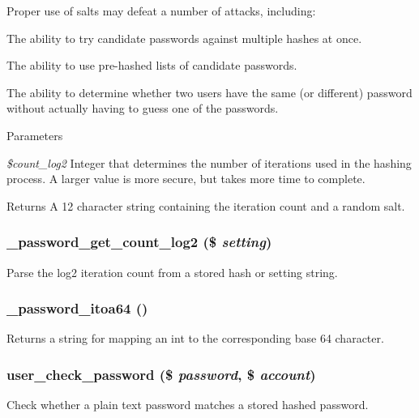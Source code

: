 Proper use of salts may defeat a number of attacks, including:
\begin{DoxyItemize}
\item The ability to try candidate passwords against multiple hashes at once.
\item The ability to use pre-\/hashed lists of candidate passwords.
\item The ability to determine whether two users have the same (or different) password without actually having to guess one of the passwords.
\end{DoxyItemize}


\begin{DoxyParams}{Parameters}
\item[{\em \$count\_\-log2}]Integer that determines the number of iterations used in the hashing process. A larger value is more secure, but takes more time to complete.\end{DoxyParams}
\begin{DoxyReturn}{Returns}
A 12 character string containing the iteration count and a random salt. 
\end{DoxyReturn}
\hypertarget{password_8inc_a9af4ef28bcef6a4f53e9eed9735848b5}{
\subsubsection[{\_\-password\_\-get\_\-count\_\-log2}]{\setlength{\rightskip}{0pt plus 5cm}\_\-password\_\-get\_\-count\_\-log2 (\$ {\em setting})}}
\label{password_8inc_a9af4ef28bcef6a4f53e9eed9735848b5}
Parse the log2 iteration count from a stored hash or setting string. \hypertarget{password_8inc_acfa07cc7bbe581412346fcc7ec03cda3}{
\subsubsection[{\_\-password\_\-itoa64}]{\setlength{\rightskip}{0pt plus 5cm}\_\-password\_\-itoa64 ()}}
\label{password_8inc_acfa07cc7bbe581412346fcc7ec03cda3}
Returns a string for mapping an int to the corresponding base 64 character. \hypertarget{password_8inc_a8fca5fd75cd7a3c609e21a48ef087868}{
\subsubsection[{user\_\-check\_\-password}]{\setlength{\rightskip}{0pt plus 5cm}user\_\-check\_\-password (\$ {\em password}, \/  \$ {\em account})}}
\label{password_8inc_a8fca5fd75cd7a3c609e21a48ef087868}
Check whether a plain text password matches a stored hashed password.

